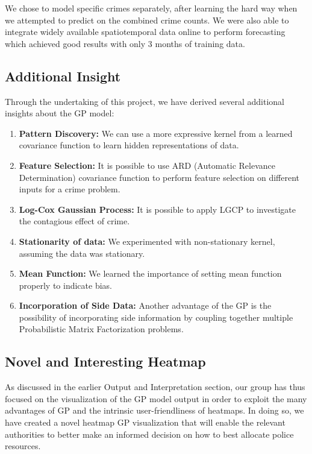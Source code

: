 \documentclass[letterpaper]{article}
\begin{document}
	We chose to model specific crimes separately, after learning the hard way when we attempted to predict on the combined crime counts. We were also able to integrate widely available spatiotemporal data online to perform forecasting which achieved good results with only 3 months of training data.
	
	\subsection{Additional Insight}
	Through the undertaking of this project, we have derived several additional insights about the GP model:
	\begin{enumerate}
		\item {\bf Pattern Discovery:} We can use a more expressive kernel from a learned covariance function to learn hidden representations of data. \autocite{c03}
		\item {\bf Feature Selection:} It is possible to use ARD (Automatic Relevance Determination) covariance function to perform feature selection on different inputs for a crime problem. \autocite{c04}
		\item {\bf Log-Cox Gaussian Process:} It is possible to apply LGCP to investigate the contagious effect of crime. \autocite{c05}
		\item {\bf Stationarity of data:} We experimented with non-stationary kernel, assuming the data was stationary.
		\item {\bf Mean Function:} We learned the importance of setting mean function properly to indicate bias.
		\item {\bf Incorporation of Side Data:} Another advantage of the GP is the possibility of incorporating side information by coupling together multiple Probabilistic Matrix Factorization problems. \autocite{c02}
	\end{enumerate}
	
	\subsection{Novel and Interesting Heatmap}
		As discussed in the earlier Output and Interpretation section, our group has thus focused on the visualization of the GP model output in order to exploit the many advantages of GP and the intrinsic user-friendliness of heatmaps.
	In doing so, we have created a novel heatmap GP visualization that will enable the relevant authorities to better make an informed decision on how to best allocate police resources.
	
\end{document}
